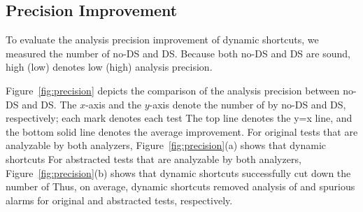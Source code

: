 \subsection{Precision Improvement}

To evaluate the analysis precision improvement of dynamic shortcuts,
we measured the number of  no-DS and DS.
Because both no-DS and DS are sound,
high (low)  denotes low (high) analysis precision.

Figure~\ref{fig:precision} depicts the comparison of the analysis
precision between no-DS and DS.  The $x$-axis and the $y$-axis denote
the number of  by no-DS and DS, respectively;
each  mark denotes each test  The top line
denotes the y=x line, and
the bottom solid line denotes the average improvement.
For  original tests that are analyzable by both analyzers,
Figure~\ref{fig:precision}(a) shows that dynamic shortcuts
For  abstracted tests that are analyzable by both analyzers,
Figure~\ref{fig:precision}(b) shows that dynamic shortcuts successfully cut down
the number of 
Thus, on average, dynamic shortcuts removed analysis of  and  spurious alarms
for original and abstracted tests, respectively.

